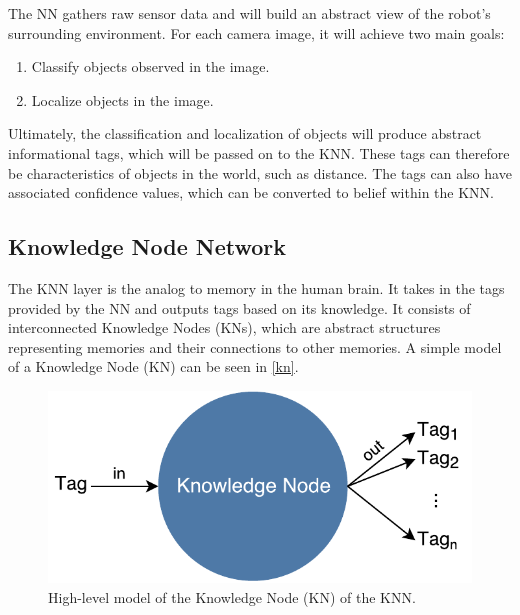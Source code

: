\documentclass[titlepage,11pt]{article}
\newcommand{\ar}[1]{\autoref{#1}}
\begin{document}
The NN gathers raw sensor data and will build an abstract view of the robot's surrounding environment. For each camera image, it will achieve two main goals:

\begin{enumerate}
	\item Classify objects observed in the image.
	\item Localize objects in the image.
\end{enumerate}

Ultimately, the classification and localization of objects will produce abstract informational tags, which will be passed on to the KNN. These tags can therefore be characteristics of objects in the world, such as distance. The tags can also have associated confidence values, which can be converted to belief within the KNN.

\subsection{Knowledge Node Network}

The KNN layer is the analog to memory in the human brain. It takes in the tags provided by the NN and outputs tags based on its knowledge. It consists of interconnected Knowledge Nodes (KNs), which are abstract structures representing memories and their connections to other memories. A simple model of a Knowledge Node (KN) can be seen in \ar{kn}.

\begin{figure}[!htb]
	\includegraphics[width=\columnwidth]{figures/knowledge_node.pdf}
	\caption[High-level model of the Knowledge Node of the KNN.]
	{High-level model of the Knowledge Node (KN) of the KNN.}
	\label{kn}
\end{figure}
\end{document}
